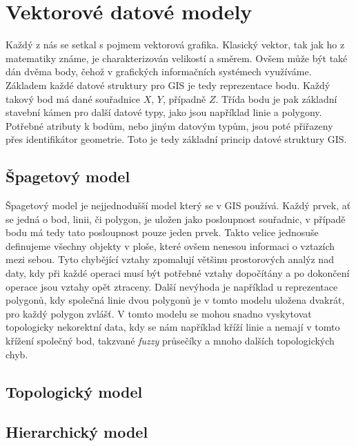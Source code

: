 \chapter{Vektorové datové modely}
\label{chap:vektorovedatovemodely}
	Každý z nás se setkal s pojmem vektorová grafika. Klasický vektor, tak jak ho z matematiky známe, je charakterizován velikostí a směrem. Ovšem může být také dán dvěma body, čehož v grafických informačních systémech využíváme. Základem každé datové struktury pro GIS je tedy reprezentace bodu. Každý takový bod má dané souřadnice $X$, $Y$, případně $Z$. Třída bodu je pak základní stavební kámen pro další datové typy, jako jsou například linie a polygony. Potřebné atributy k bodům, nebo jiným datovým typům, jsou poté přiřazeny přes identifikátor geometrie. Toto je tedy základní princip datové struktury GIS.
	
\section{Špagetový model}
	Špagetový model je nejjednodušší model který se v GIS používá. Každý prvek, ať se jedná o bod, linii, či polygon, je uložen jako posloupnost souřadnic, v případě bodu má tedy tato posloupnost pouze jeden prvek. Takto velice jednosuše definujeme všechny objekty v ploše, které ovšem nenesou informaci o vztazích mezi sebou. Tyto chybějící vztahy zpomalují většinu prostorových analýz nad daty, kdy při každé operaci musí být potřebné vztahy dopočítány a po dokončení operace jsou vztahy opět ztraceny. Další nevýhoda je například u reprezentace polygonů, kdy společná linie dvou polygonů je v tomto modelu uložena dvakrát, pro každý polygon zvlášť. V tomto modelu se mohou snadno vyskytovat topologicky nekorektní data, kdy se nám například kříží linie a nemají v tomto křížení společný bod, takzvané \textit{fuzzy} průsečíky a mnoho dalších topologických chyb. \cite{QGIS_software} \cite{tucek1997geograficke} \cite{kolar2003geograficke}
	
\section{Topologický model}
	


\section{Hierarchický model}



